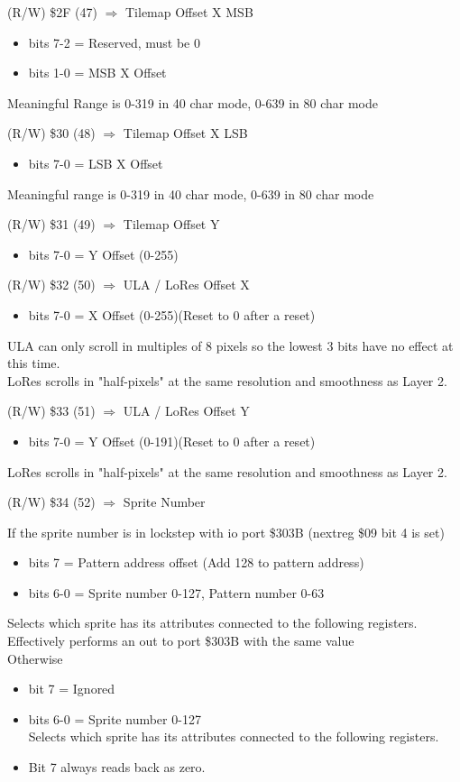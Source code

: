 (R/W) \$2F (47) $\Rightarrow$ Tilemap Offset X MSB
\begin{itemize}
\item[] bits 7-2 = Reserved, must be 0
\item[] bits 1-0 = MSB X Offset
\end{itemize}
Meaningful Range is 0-319 in 40 char mode, 0-639 in 80 char mode

(R/W) \$30 (48) $\Rightarrow$ Tilemap Offset X LSB
\begin{itemize}
\item[] bits 7-0 = LSB X Offset
\end{itemize}
Meaningful range is 0-319 in 40 char mode, 0-639 in 80 char mode

(R/W) \$31 (49) $\Rightarrow$ Tilemap Offset Y
\begin{itemize}
\item[] bits 7-0 = Y Offset (0-255)
\end{itemize}

(R/W) \$32 (50) $\Rightarrow$ ULA / LoRes Offset X
\begin{itemize}
\item[] bits 7-0 = X Offset (0-255)(Reset to 0 after a reset)
\end{itemize}
ULA can only scroll in multiples of 8 pixels so the lowest 3 bits have
no effect at this time.\\
LoRes scrolls in "half-pixels" at the same resolution and smoothness
as Layer 2.

(R/W) \$33 (51) $\Rightarrow$ ULA / LoRes Offset Y
\begin{itemize}
\item[] bits 7-0 = Y Offset (0-191)(Reset to 0 after a reset)
\end{itemize}
LoRes scrolls in "half-pixels" at the same resolution and smoothness
as Layer 2.

(R/W) \$34 (52) $\Rightarrow$ Sprite Number

If the sprite number is in lockstep with io port \$303B (nextreg \$09
bit 4 is set)
\begin{itemize}
\item[] bits 7 = Pattern address offset (Add 128 to pattern address)
\item[] bits 6-0 = Sprite number 0-127, Pattern number 0-63
\end{itemize}
Selects which sprite has its attributes connected to the following
registers.  Effectively performs an out to port \$303B with the same
value\\
Otherwise
\begin{itemize}
\item[] bit 7 = Ignored
\item[] bits 6-0 = Sprite number 0-127\\
  Selects which sprite has its attributes connected to the following registers.
\item[] Bit 7 always reads back as zero.
\end{itemize}

